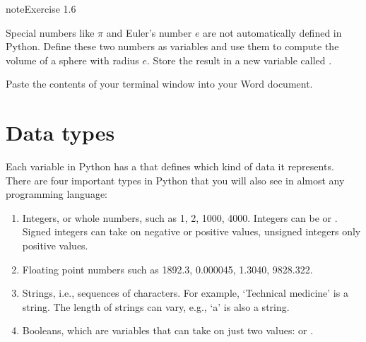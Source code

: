 \documentclass[letterpaper,10pt,english]{jupyterBook}
\begin{document}
\begin{sphinxVerbatim}[commandchars=\\\{\}]
      
\end{sphinxVerbatim}

\begin{sphinxadmonition}{note}{Exercise 1.6}

\sphinxAtStartPar
Special numbers like \(\pi\) and Euler’s number \(e\) are not automatically defined in Python. Define these two numbers as variables and use them to compute the volume of a sphere with radius \(e\). Store the result in a new variable called .

\sphinxAtStartPar
Paste the contents of your terminal window into your Word document.
\end{sphinxadmonition}


\section{Data types}
\label{\detokenize{notebooks/01_GettingStarted/01_GettingStarted_student:data-types}}
\sphinxAtStartPar
Each variable in Python has a  that defines which kind of data it represents. There are four important types in Python that you will also see in almost any programming language:
\begin{enumerate}
%
\item {} 
\sphinxAtStartPar
Integers, or whole numbers, such as 1, 2, 1000, 4000. Integers can be  or . Signed integers can take on negative or positive values, unsigned integers only positive values.

\item {} 
\sphinxAtStartPar
Floating point numbers such as \sphinxhyphen{}1892.3, 0.000045, 1.3040, 9828.322.

\item {} 
\sphinxAtStartPar
Strings, i.e., sequences of characters. For example, ‘Technical medicine’ is a string. The length of strings can vary, e.g., ‘a’ is also a string.

\item {} 
\sphinxAtStartPar
Booleans, which are variables that can take on just two values:  or .

\end{enumerate}
\end{document}
